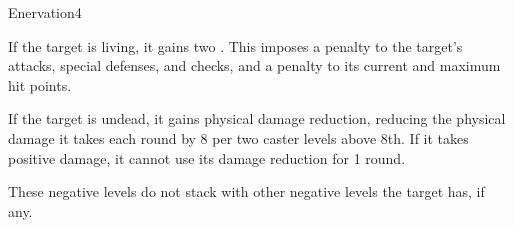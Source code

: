 \begin{spellsection}{Enervation}{4}
\begin{spellheader}
\end{spellheader}
\begin{spellcontent}
    \begin{spelltargetinginfo}
    \end{spelltargetinginfo}
    \begin{spelleffects}
        \spellsuccess If the target is living, it gains two . This imposes a  penalty to the target's attacks, special defenses, and checks, and a  penalty to its current and maximum hit points.

        If the target is undead, it gains physical damage reduction, reducing the physical damage it takes each round by 8  per two caster levels above 8th. If it takes positive damage, it cannot use its damage reduction for 1 round.
    \end{spelleffects}
\end{spellcontent}
\begin{spellfooter}
    \spellnotes These negative levels do not stack with other negative levels the target has, if any.
\end{spellfooter}
\end{spellsection}

